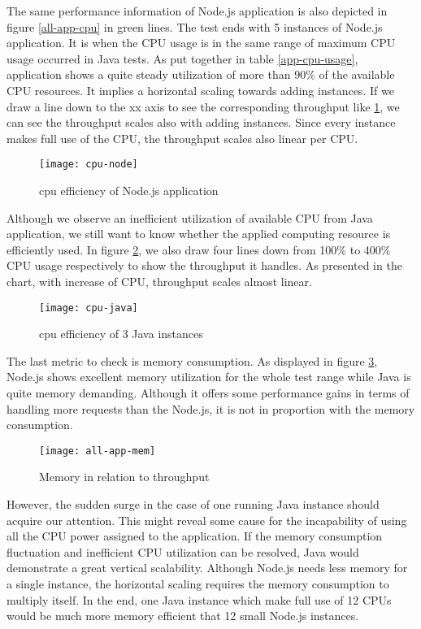 The same performance information of Node.js application is also depicted in figure \ref{all-app-cpu} in green lines. The test ends with 5 instances of Node.js application. It is when the CPU usage is in the same range of maximum CPU usage occurred in Java tests. As put together in table \ref{app-cpu-usage}, application shows a quite steady utilization of more than 90\% of the available CPU resources. It implies a horizontal scaling towards adding instances. If we draw a line down to the xx axis to see the corresponding throughput like \ref{cpu-node}, we can see the throughput scales also with adding instances. Since every instance makes full use of the CPU, the throughput scales also linear per CPU. \\
 \begin{figure}[h]
	\centering
	\texttt{[image: cpu-node]}
	\caption{cpu efficiency of Node.js application}
	\label{cpu-node}
\end{figure}

Although we observe an inefficient utilization of available CPU from Java application, we still want to know whether the applied computing resource is efficiently used. In figure \ref{cpu-java}, we also draw four lines down from 100\% to 400\% CPU usage respectively to show the throughput it handles. As presented in the chart, with increase of CPU, throughput scales almost linear.
 \begin{figure}[h]
	\centering
	\texttt{[image: cpu-java]}
	\caption{cpu efficiency of 3 Java instances}
	\label{cpu-java}
\end{figure}

The last metric to check is memory consumption. As displayed in figure \ref{all-app-memory}, Node.js shows excellent memory utilization for the whole test range while Java is quite memory demanding. Although it offers some performance gains in terms of handling more requests than the Node.js, it is not in proportion with the memory consumption. \\

 \begin{figure}[h]
	\centering
	\texttt{[image: all-app-mem]}
	\caption{Memory in relation to throughput}
	\label{all-app-memory}
\end{figure}

However, the sudden surge in the case of one running Java instance should acquire our attention. This might reveal some cause for the incapability of using all the CPU power assigned to the application. If the memory consumption fluctuation and inefficient CPU utilization can be resolved,  Java would demonstrate a great vertical scalability. Although Node.js needs less memory for a single instance, the horizontal scaling requires the memory consumption to multiply itself. In the end, one Java instance which make full use of 12 CPUs would be much more memory efficient that 12 small Node.js instances. 